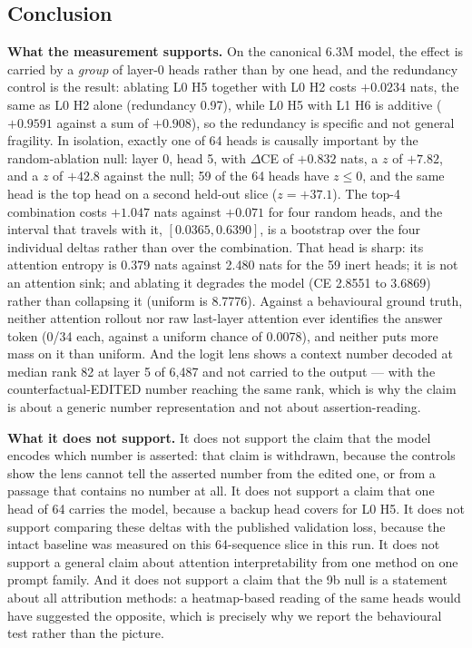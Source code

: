 \documentclass[11pt,a4paper]{article}
\begin{document}
\subsection{Conclusion}
\label{sec:act9-conclusion}

\textbf{What the measurement supports.} On the canonical 6.3M model, the effect
is carried by a \emph{group} of layer-0 heads rather than by one head, and
the redundancy control is the result: ablating L0 H5 together with L0 H2
costs $+0.0234$ nats, the same as L0 H2 alone (redundancy 0.97), while L0 H5
with L1 H6 is additive ($+0.9591$ against a sum of $+0.908$), so the
redundancy is specific and not general fragility. In isolation, exactly one
of 64 heads is causally important by the random-ablation null: layer 0,
head 5, with $\Delta$CE of $+0.832$ nats, a $z$ of $+7.82$, and a $z$ of
$+42.8$ against the null; 59 of the 64 heads have $z \leq 0$, and the same
head is the top head on a second held-out slice ($z = +37.1$). The top-4
combination costs $+1.047$ nats against $+0.071$ for four random heads, and
the interval that travels with it, $[0.0365, 0.6390]$, is a bootstrap over
the four individual deltas rather than over the combination. That head is
sharp: its attention entropy is 0.379 nats against 2.480 nats for the 59
inert heads; it is not an attention sink; and ablating it degrades the model
(CE 2.8551 to 3.6869) rather than collapsing it (uniform is 8.7776).
Against a behavioural ground truth, neither attention rollout nor raw
last-layer attention ever identifies the answer token (0/34 each, against a
uniform chance of 0.0078), and neither puts more mass on it than uniform. And
the logit lens shows a context number decoded at median rank 82 at layer 5 of
6,487 and not carried to the output --- with the counterfactual-EDITED number
reaching the same rank, which is why the claim is about a generic number
representation and not about assertion-reading.

\textbf{What it does not support.} It does not support the claim that the
model encodes which number is asserted: that claim is withdrawn, because the
controls show the lens cannot tell the asserted number from the edited one, or
from a passage that contains no number at all. It does not support a claim
that one head of 64 carries the model, because a backup head covers for L0 H5.
It does not support comparing these deltas with the published validation
loss, because the intact baseline was measured on this 64-sequence slice in
this run. It does not support a general claim about attention interpretability
from one method on one prompt family. And it does not support a claim that the
9b null is a statement about all attribution methods: a heatmap-based reading
of the same heads would have suggested the opposite, which is precisely why we
report the behavioural test rather than the picture.
\end{document}
